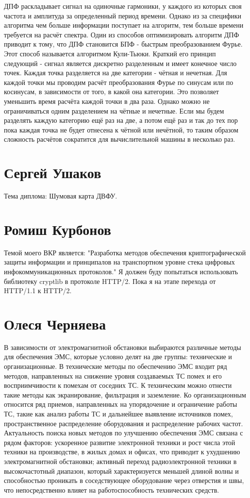 \documentclass{article}
\begin{document}
ДПФ раскладывает сигнал на одиночные гармоники, у каждого из которых своя частота и амплитуда за определенный период времени.
Однако из за специфики алгоритма чем больше информации поступает на алгоритм, тем больше времени требуется на расчёт спектра.
Один из способов оптимизировать алгоритм ДПФ приводит к тому, что ДПФ становится БПФ - быстрым преобразованием Фурье.
Этот способ называется алгоритмом Кули-Тьюки.
Краткий его принцип следующий - сигнал является дискретно разделенным и имеет конечное число точек. Каждая точка разделяется на две категории - чётная и нечетная.
Для каждой точки мы проводим расчёт преобразования Фурье по синусам или по косинусам, в зависимости от того, в какой она категории.
Это позволяет уменьшить время расчёта каждой точки в два раза.
Однако можно не ограничиваться одним разделением на чётные и нечетные.
Если мы будем разделять каждую категорию ещё раз на две, а потом ещё раз и так до тех пор пока каждая точка не будет отнесена к чётной или нечётной, то таким образом сложность расчётов сократится для вычислительной машины в несколько раз.

\section*{Сергей Ушаков}

Тема диплома: Шумовая карта ДВФУ.

\section*{Ромиш Курбонов}

Темой моего ВКР является: "Разработка методов обеспечения криптографической защиты информации и принципалов на транспортном уровне стека цифровых инфокоммуникационных протоколов."
Я должен буду попытаться использовать библиотеку cryptlib в протоколе HTTP/2. Пока я на этапе перехода от HTTP/1.1 к HTTP/2.

\section*{Олеся Черняева}
В зависимости от электромагнитной обстановки выбираются различные методы для обеспечения ЭМС, которые условно делят на две группы: технические и организационные. В технические методы по обеспечению ЭМС входит ряд методов, направленных на снижение уровня создаваемых ТС помех и его восприимчивости к помехам от соседних ТС. К техническим можно отнести такие методы как экранирование, фильтрация и заземление. Ко организационным относится ряд приемов, направленных на упорядочение и ограничение работы ТС, такие как анализ работы ТС и дальнейшее выявление источников помех, пространственное распределение оборудования и распределение рабочих частот. 
Актуальность поиска новых методов по улучшению обеспечения ЭМС связана с рядом факторов: ускоренное развитие электронной техники и рост числа этой техники на производстве, в жилых домах и офисах, что приводит к ухудшению электромагнитной обстановки; активный переход радиоэлектронной техники в высокочастотный диапазон, который характеризуется меньшей длиной волны и способностью проникать в соседствующее оборудование через отверстия и швы, что непосредственно влияет на работоспособность технических средств. 
\end{document}

